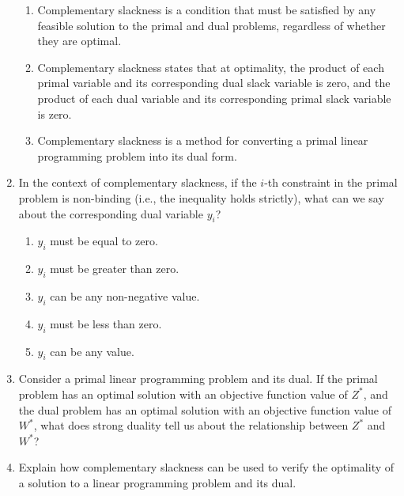 \documentclass{article}%
\begin{document}
\begin{enumerate}
\begin{enumerate}
\item Complementary slackness is a condition that must be satisfied by any feasible solution to the primal and dual problems, regardless of whether they are optimal.%
\item Complementary slackness states that at optimality, the product of each primal variable and its corresponding dual slack variable is zero, and the product of each dual variable and its corresponding primal slack variable is zero.%
\item Complementary slackness is a method for converting a primal linear programming problem into its dual form.%
\end{enumerate}%
\vspace{1em}%
\item In the context of complementary slackness, if the $i$-th constraint in the primal problem is non-binding (i.e., the inequality holds strictly), what can we say about the corresponding dual variable $y_i$?%
\begin{enumerate}%
\item $y_i$ must be equal to zero.%
\item $y_i$ must be greater than zero.%
\item $y_i$ can be any non-negative value.%
\item $y_i$ must be less than zero.%
\item $y_i$ can be any value.%
\end{enumerate}%
\vspace{1em}%
\item Consider a primal linear programming problem and its dual.  If the primal problem has an optimal solution with an objective function value of $Z^*$, and the dual problem has an optimal solution with an objective function value of $W^*$, what does strong duality tell us about the relationship between $Z^*$ and $W^*$?%
%
\vspace{1em}%
\item Explain how complementary slackness can be used to verify the optimality of a solution to a linear programming problem and its dual.%
\begin{enumerate}%

\end{enumerate}
\end{enumerate}
\end{document}
